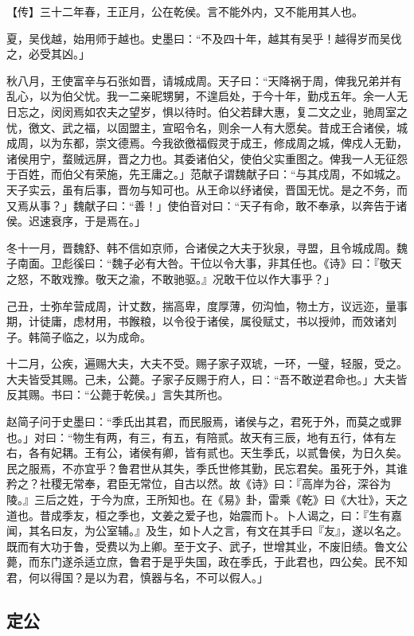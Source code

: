 \documentclass[]{article}
\begin{document}
【传】三十二年春，王正月，公在乾侯。言不能外内，又不能用其人也。

夏，吴伐越，始用师于越也。史墨曰：``不及四十年，越其有吴乎！越得岁而吴伐之，必受其凶。」

秋八月，王使富辛与石张如晋，请城成周。天子曰：``天降祸于周，俾我兄弟并有乱心，以为伯父忧。我一二亲昵甥舅，不遑启处，于今十年，勤戍五年。余一人无日忘之，闵闵焉如农夫之望岁，惧以待时。伯父若肆大惠，复二文之业，驰周室之忧，徼文、武之福，以固盟主，宣昭令名，则余一人有大愿矣。昔成王合诸侯，城成周，以为东都，崇文德焉。今我欲徼福假灵于成王，修成周之城，俾戍人无勤，诸侯用宁，蝥贼远屏，晋之力也。其委诸伯父，使伯父实重图之。俾我一人无征怨于百姓，而伯父有荣施，先王庸之。」范献子谓魏献子曰：``与其戍周，不如城之。天子实云，虽有后事，晋勿与知可也。从王命以纾诸侯，晋国无忧。是之不务，而又焉从事？」魏献子曰：``善！」使伯音对曰：``天子有命，敢不奉承，以奔告于诸侯。迟速衰序，于是焉在。」

冬十一月，晋魏舒、韩不信如京师，合诸侯之大夫于狄泉，寻盟，且令城成周。魏子南面。卫彪徯曰：``魏子必有大咎。干位以令大事，非其任也。《诗》曰：『敬天之怒，不敢戏豫。敬天之渝，不敢驰驱。』况敢干位以作大事乎？」

己丑，士弥牟营成周，计丈数，揣高卑，度厚薄，仞沟恤，物土方，议远迩，量事期，计徒庸，虑材用，书餱粮，以令役于诸侯，属役赋丈，书以授帅，而效诸刘子。韩简子临之，以为成命。

十二月，公疾，遍赐大夫，大夫不受。赐子家子双琥，一环，一璧，轻服，受之。大夫皆受其赐。己未，公薨。子家子反赐于府人，曰：``吾不敢逆君命也。」大夫皆反其赐。书曰：``公薨于乾侯。」言失其所也。

赵简子问于史墨曰：``季氏出其君，而民服焉，诸侯与之，君死于外，而莫之或罪也。」对曰：``物生有两，有三，有五，有陪贰。故天有三辰，地有五行，体有左右，各有妃耦。王有公，诸侯有卿，皆有贰也。天生季氏，以贰鲁侯，为日久矣。民之服焉，不亦宜乎？鲁君世从其失，季氏世修其勤，民忘君矣。虽死于外，其谁矜之？社稷无常奉，君臣无常位，自古以然。故《诗》曰：『高岸为谷，深谷为陵。』三后之姓，于今为庶，王所知也。在《易》卦，雷乘《乾》曰《大壮》，天之道也。昔成季友，桓之季也，文姜之爱子也，始震而卜。卜人谒之，曰：『生有嘉闻，其名曰友，为公室辅。』及生，如卜人之言，有文在其手曰『友』，遂以名之。既而有大功于鲁，受费以为上卿。至于文子、武子，世增其业，不废旧绩。鲁文公薨，而东门遂杀适立庶，鲁君于是乎失国，政在季氏，于此君也，四公矣。民不知君，何以得国？是以为君，慎器与名，不可以假人。」

\hypertarget{header-n2872}{%
\subsection{定公}\label{header-n2872}}
\end{document}

